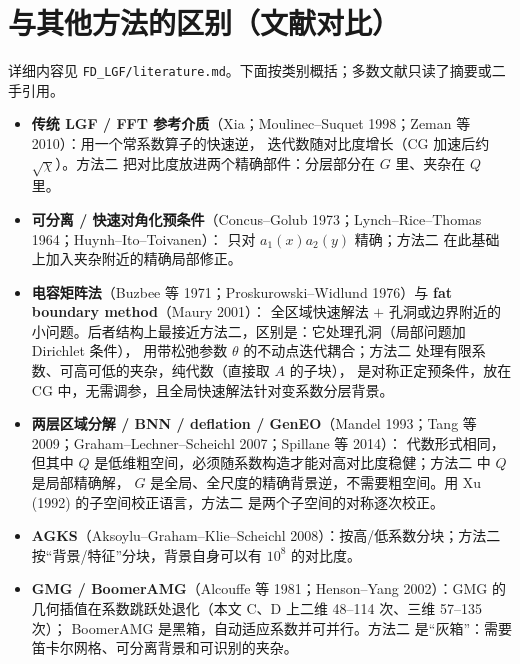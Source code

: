 \documentclass[11pt,a4paper]{ctexart}
\newcommand{\Mtwo}{方法二}
\begin{document}
\section{与其他方法的区别（文献对比）}
详细内容见 \texttt{FD\_LGF/literature.md}。下面按类别概括；多数文献只读了摘要或二手引用。
\begin{itemize}
\item \textbf{传统 LGF / FFT 参考介质}（Xia；Moulinec--Suquet 1998；Zeman 等 2010）：用一个常系数算子的快速逆，
  迭代数随对比度增长（CG 加速后约 $\sqrt\chi$）。\Mtwo{} 把对比度放进两个精确部件：分层部分在 $G$ 里、夹杂在 $Q$ 里。
\item \textbf{可分离 / 快速对角化预条件}（Concus--Golub 1973；Lynch--Rice--Thomas 1964；Huynh--Ito--Toivanen）：
  只对 $a_1(x)a_2(y)$ 精确；\Mtwo{} 在此基础上加入夹杂附近的精确局部修正。
\item \textbf{电容矩阵法}（Buzbee 等 1971；Proskurowski--Widlund 1976）与 \textbf{fat boundary method}（Maury 2001）：
  全区域快速解法 $+$ 孔洞或边界附近的小问题。后者结构上最接近\Mtwo{}，区别是：它处理孔洞（局部问题加 Dirichlet 条件），
  用带松弛参数 $\theta$ 的不动点迭代耦合；\Mtwo{} 处理有限系数、可高可低的夹杂，纯代数（直接取 $A$ 的子块），
  是对称正定预条件，放在 CG 中，无需调参，且全局快速解法针对变系数分层背景。
\item \textbf{两层区域分解 / BNN / deflation / GenEO}（Mandel 1993；Tang 等 2009；Graham--Lechner--Scheichl 2007；Spillane 等 2014）：
  代数形式相同，但其中 $Q$ 是低维粗空间，必须随系数构造才能对高对比度稳健；\Mtwo{} 中 $Q$ 是局部精确解，
  $G$ 是全局、全尺度的精确背景逆，不需要粗空间。用 Xu (1992) 的子空间校正语言，\Mtwo{} 是两个子空间的对称逐次校正。
\item \textbf{AGKS}（Aksoylu--Graham--Klie--Scheichl 2008）：按高/低系数分块；\Mtwo{} 按“背景/特征”分块，背景自身可以有 $10^8$ 的对比度。
\item \textbf{GMG / BoomerAMG}（Alcouffe 等 1981；Henson--Yang 2002）：GMG 的几何插值在系数跳跃处退化（本文 C、D 上二维 48--114 次、三维 57--135 次）；
  BoomerAMG 是黑箱，自动适应系数并可并行。\Mtwo{} 是“灰箱”：需要笛卡尔网格、可分离背景和可识别的夹杂。
\end{itemize}
\end{document}
